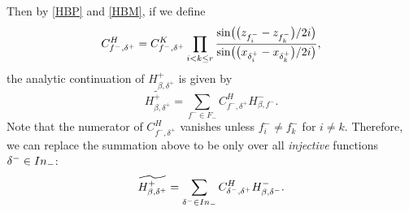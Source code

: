 \documentclass[11pt]{article}
\numberwithin{equation}{section}
\numberwithin{equation}{section}
\newcommand{\z}{z}
\newcommand{\x}{x}
\begin{document}
Then by \eqref{HBP} and \eqref{HBM}, if we define
\[
C^H_{f^-, \delta^+} = C^K_{f^-, \delta^+} \prod_{i<k\leq r} \frac{\sin\bigl(\bigl(\z_{f^-_i} - \z_{f^-_k}\bigr)/2{\rm i}\bigr)}{ \sin\bigl(\bigl(\x_{\delta^+_i} - \x_{\delta^+_k}\bigr)/2{\rm i}\bigr)},
\]
the analytic continuation of $H^{+}_{\beta, \delta^+}$ is given by
\[
\widetilde{H^{+}_{\beta, \delta^+}} =\sum_{f^- \in F_-} C^H_{f^-, \delta^+} H^{-}_{\beta, f^-}.
\]
Note that the numerator of $C^H_{f^-, \delta^+}$ vanishes unless $f^-_i \neq f^-_k$ for $i \neq k$. Therefore, we can replace the summation above to be only over all \emph{injective} functions $\delta^- \in {\rm In}_-$:
\begin{equation}\label{e: CH} \widetilde{H^{+}_{\beta, \delta^+}} = \sum_{\delta^- \in {\rm In}_-} C^H_{\delta^-, \delta^+} H^{-}_{\beta, \delta^-}.\end{equation}
\end{document}

